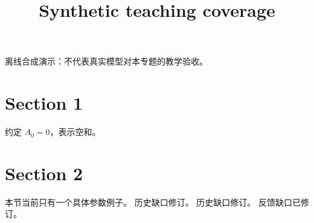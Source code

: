 \documentclass[UTF8,fontset=fandol,11pt]{ctexart}
\title{Synthetic teaching coverage}
\date{}
\begin{document}
\maketitle
\par\noindent 离线合成演示：不代表真实模型对本专题的教学验收。\par
\section{Section 1}\label{sec:S01}
约定 $A_0=0$，表示空和。\par
\section{Section 2}\label{sec:S02}
本节当前只有一个具体参数例子。 历史缺口修订。 历史缺口修订。 反馈缺口已修订。\par
\end{document}
